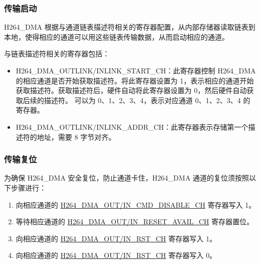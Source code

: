 \documentclass[main\_\_CN.tex]{subfiles}
\begin{document}
\subsubsection{传输启动}\label{sec:h264-dma-start}

H264\_DMA 根据与通道链表描述符相关的寄存器配置，从内部存储器读取链表到本地，使得相应的通道可以用这些链表传输数据，从而启动相应的通道。

与链表描述符相关的寄存器包括：
\begin{itemize}
    \item H264\_DMA\_OUTLINK/INLINK\_START\_CH：此寄存器控制 H264\_DMA 的相应通道是否开始获取描述符。将此寄存器设置为 1，表示相应的通道开始获取描述符。获取描述符后，硬件自动将此寄存器设置为 0，然后硬件自动获取后续的描述符。 可以为 0、1、2、3、4，表示对应通道 0、1、2、3、4 的寄存器。
    \item H264\_DMA\_OUTLINK/INLINK\_ADDR\_CH：此寄存器表示存储第一个描述符的地址，需要 8 字节对齐。

\end{itemize}

\subsubsection{传输复位}\label{sec:h264-dma-reset}
为确保 H264\_DMA 安全复位，防止通道卡住，H264\_DMA 通道的复位须按照以下步骤进行：
\begin{enumerate}
    \item 向相应通道的 \hyperref[fielddesc:H264DMAOUTCMDDISABLECH0]{H264\_DMA\_OUT/IN\_CMD\_DISABLE\_CH} 寄存器写入 1。
    \item 等待相应通道的 \hyperref[fielddesc:H264DMAOUTRESETAVAILCH0]{H264\_DMA\_OUT/IN\_RESET\_AVAIL\_CH} 寄存器置位。
    \item 向相应通道的 \hyperref[fielddesc:H264DMAOUTRSTCH0]{H264\_DMA\_OUT/IN\_RST\_CH} 寄存器写入 1。
    \item 向相应通道的 \hyperref[fielddesc:H264DMAOUTRSTCH0]{H264\_DMA\_OUT/IN\_RST\_CH} 寄存器写入 0。
\end{enumerate}
\end{document}
